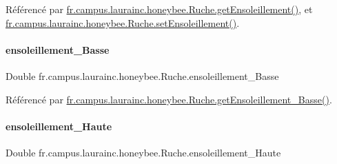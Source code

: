 Référencé par \hyperlink{classfr_1_1campus_1_1laurainc_1_1honeybee_1_1_ruche_a18a40461d368f06fd0532bfa1b63b868}{fr.\+campus.\+laurainc.\+honeybee.\+Ruche.\+get\+Ensoleillement()}, et \hyperlink{classfr_1_1campus_1_1laurainc_1_1honeybee_1_1_ruche_a19b9dae9928c6d8267c7c7c7ca3375aa}{fr.\+campus.\+laurainc.\+honeybee.\+Ruche.\+set\+Ensoleillement()}.

\mbox{\label{classfr_1_1campus_1_1laurainc_1_1honeybee_1_1_ruche_a715ecfaedd6f31a078667e7f67348666}} 
\paragraph{\texorpdfstring{ensoleillement\+\_\+\+Basse}{ensoleillement\_Basse}}
{\footnotesize\ttfamily Double fr.\+campus.\+laurainc.\+honeybee.\+Ruche.\+ensoleillement\+\_\+\+Basse\hspace{0.3cm}{\ttfamily [private]}}



Référencé par \hyperlink{classfr_1_1campus_1_1laurainc_1_1honeybee_1_1_ruche_ac7c7998ec56bfc71b6f1a240aec67cbc}{fr.\+campus.\+laurainc.\+honeybee.\+Ruche.\+get\+Ensoleillement\+\_\+\+Basse()}.

\mbox{\label{classfr_1_1campus_1_1laurainc_1_1honeybee_1_1_ruche_a3b55f2c08cef225db52991e4023201c7}} 
\paragraph{\texorpdfstring{ensoleillement\+\_\+\+Haute}{ensoleillement\_Haute}}
{\footnotesize\ttfamily Double fr.\+campus.\+laurainc.\+honeybee.\+Ruche.\+ensoleillement\+\_\+\+Haute\hspace{0.3cm}{\ttfamily [private]}}



